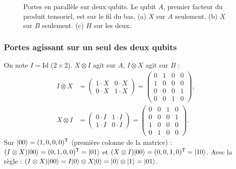 \begin{figure}[!ht]
\centering
{}
\caption{Portes en parallèle sur deux qubits. Le qubit $A$, premier facteur du produit tensoriel,
est sur le fil du bas. (a) $X$ sur $A$ seulement. (b) $X$ sur $B$ seulement. (c) $H$ sur les deux.}
\label{fig:local}
\end{figure}

\subsubsection{Portes agissant sur un seul des deux qubits}

On note $I=\mathrm{Id}$ ($2\times2$). $X\otimes I$ agit sur $A$, $I\otimes X$ agit sur $B$ :
\begin{align*}
  I\otimes X&=\begin{pmatrix}1\cdot X & 0\cdot X\\ 0\cdot X & 1\cdot X\end{pmatrix}
    =\begin{pmatrix}0 & 1 & 0 & 0\\ 1 & 0 & 0 & 0\\ 0 & 0 & 0 & 1\\ 0 & 0 & 1 & 0\end{pmatrix},\\[1ex]
  X\otimes I&=\begin{pmatrix}0\cdot I & 1\cdot I\\ 1\cdot I & 0\cdot I\end{pmatrix}
    =\begin{pmatrix}0 & 0 & 1 & 0\\ 0 & 0 & 0 & 1\\ 1 & 0 & 0 & 0\\ 0 & 1 & 0 & 0\end{pmatrix}.
\end{align*}
Sur $|00\rangle=(1,0,0,0)^{\mathsf T}$ (première colonne de la matrice) :
$(I\otimes X)|00\rangle=(0,1,0,0)^{\mathsf T}=|01\rangle$ et
$(X\otimes I)|00\rangle=(0,0,1,0)^{\mathsf T}=|10\rangle$. Avec la règle :
$(I\otimes X)|00\rangle=I|0\rangle\otimes X|0\rangle=|0\rangle\otimes|1\rangle=|01\rangle$.

